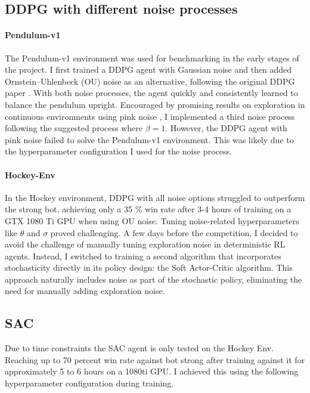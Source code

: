 \subsection{DDPG with different noise processes}
\paragraph{Pendulum-v1}
The Pendulum-v1 environment was used for benchmarking in the early stages of the project. I first trained a DDPG agent with Gaussian noise and then added Ornstein–Uhlenbeck (OU) noise as an alternative, following the original DDPG paper \cite{ddpg_original}. With both noise processes, the agent quickly and consistently learned to balance the pendulum upright.
Encouraged by promising results on exploration in continuous environments using pink noise \cite{eberhard2023pink}, I implemented a third noise process following the suggested process where \(\beta = 1\). However, the DDPG agent with pink noise failed to solve the Pendulum-v1 environment. This was likely due to the hyperparameter configuration I used for the noise process.
\paragraph{Hockey-Env} 
In the Hockey environment, DDPG with all noise options struggled to outperform the strong bot, achieving only a 35 \% win rate after 3-4 hours of training on a GTX 1080 Ti GPU when using OU noise. Tuning noise-related hyperparameters like $\theta$ and $\sigma$ proved challenging. A few days before the competition, I decided to avoid the challenge of manually tuning exploration noise in deterministic RL agents. Instead, I switched to training a second algorithm that incorporates stochasticity directly in its policy design: the Soft Actor-Critic algorithm. This approach naturally includes noise as part of the stochastic policy, eliminating the need for manually adding exploration noise.
\subsection{SAC}
Due to time constraints the SAC agent is only tested on the Hockey Env. Reaching up to 70 percent win rate against bot strong after training against it for approximately 5 to 6 hours on a 1080ti GPU. I achieved this using the following hyperparameter configuration during training.
